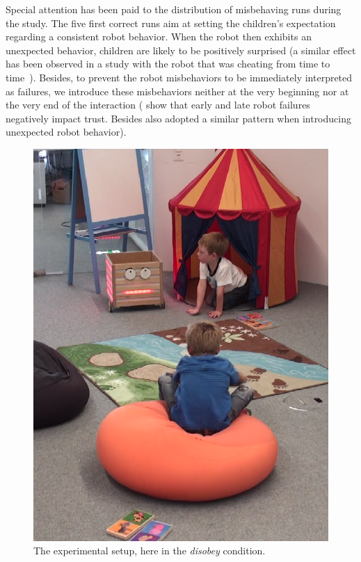 \documentclass[letterpaper, 10pt, conference]{ieeeconf}
\begin{document}
Special attention has been paid to the distribution of misbehaving runs during
the study. The five first correct runs aim at setting the children's expectation
regarding a consistent robot behavior. When the robot then exhibits an
unexpected behavior, children are likely to be positively surprised (a similar
effect has been observed in a study with the robot that was cheating from time
to time~\cite{short_no_2010}). Besides, to prevent the robot misbehaviors to be
immediately interpreted as failures, we introduce these misbehaviors neither at
the very beginning nor at the very end of the interaction
(\cite{desai_effects_2012,desai_impact_2013} show that early and late robot
failures negatively impact trust. Besides \cite{short_no_2010} also adopted a
similar pattern when introducing unexpected robot behavior).

%

\begin{figure}[!t]
    \centering
    \includegraphics[width=0.6\columnwidth]{domino-disobey.png}
    \caption{\small The experimental setup, here in the \emph{disobey} condition.}
    \label{fig:domino-misbehavior}
\end{figure}
\end{document}
